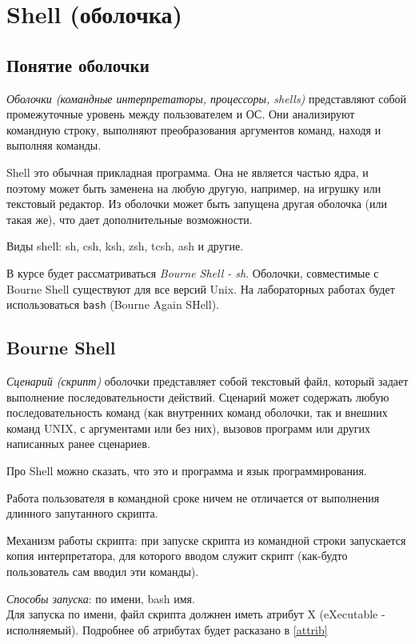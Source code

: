 \chapter{Shell (оболочка)}
\section{Понятие оболочки}

\emph{Оболочки (командные интерпретаторы, процессоры, shells)} представляют собой промежуточные уровень между пользователем и ОС. Они анализируют командную строку, выполняют преобразования аргументов команд, находя и выполняя команды.

Shell  это обычная прикладная программа. Она не является частью ядра, и поэтому может быть заменена на любую другую, например, на игрушку или текстовый редактор. Из оболочки может быть запущена другая оболочка (или такая же), что дает дополнительные возможности.

Виды shell: sh, csh, ksh, zsh, tcsh, ash и другие.

В курсе будет рассматриваться \emph{Bourne Shell - sh}. Оболочки, совместимые с Bourne Shell существуют для все версий Unix. На лабораторных работах будет использоваться \verb+bash+ (Bourne Again SHell).

\section{Bourne Shell}

\emph{Сценарий (скрипт)} оболочки представляет собой текстовый файл, который задает выполнение последовательности действий. Сценарий может содержать любую последовательность команд (как внутренних команд оболочки, так и внешних команд UNIX, с аргументами или без них), вызовов программ или других написанных ранее сценариев.

Про Shell можно сказать, что это и программа и язык программирования.

Работа пользователя в командной сроке ничем не отличается от выполнения длинного запутанного скрипта.

Механизм работы скрипта: при запуске скрипта из командной строки запускается копия интерпретатора, для которого вводом служит скрипт (как-будто пользователь сам вводил эти команды).

\emph{Способы запуска}: по имени, bash имя.\\
Для запуска по имени, файл скрипта должнен иметь атрибут X (eXecutable - исполняемый). Подробнее  об атрибутах будет расказано в \ref{attrib} 


